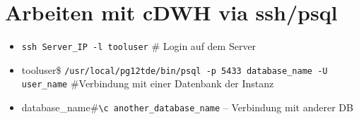    \section{Arbeiten mit \ac{cDWH} via ssh/psql}
   
   \begin{itemize}
   	\item \texttt{ssh Server\_IP -l tooluser} \# Login auf dem Server
   	\item tooluser\$ \texttt{/usr/local/pg12tde/bin/psql -p 5433 database\_name -U user\_name} \#Verbindung mit einer Datenbank der Instanz 
   	\item database\_name\#\texttt{\textbackslash c another\_database\_name} -- Verbindung mit anderer \ac{DB}
   \end{itemize}
